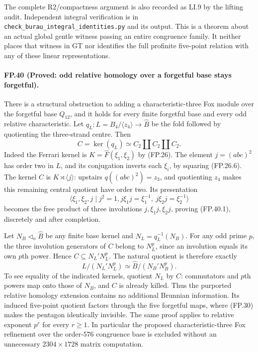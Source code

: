 The complete R2/compactness argument is also recorded as LI.9
by the lifting audit. Independent integral verification is in
\texttt{check\_burau\_integral\_identities.py} and its output.
This is a theorem about an actual global gentle witness passing
an entire congruence family. It neither places that witness in
GT nor identifies the full profinite five-point relation with
any of these linear representations.

\paragraph{FP.40 (Proved: odd relative homology over a forgetful base stays forgetful).}
There is a structural obstruction to adding a characteristic-three
Fox module over the forgetful base $Q_{12}$, and it holds for
every finite forgetful base and every odd relative characteristic.
Let $q_L:L=B_4/\langle z_4\rangle\to\widehat B$ be the
fold followed by quotienting the three-strand centre. Then
\[
                  C=\ker(q_L)\simeq C_2\amalg C_2\amalg C_2.
 \tag{FP.40.1}
\]
Indeed the Ferrari kernel is $K=\widehat F(\xi_1,\xi_2)$
by (FP.26). The element $j=(abc)^2$ has order two in $L$,
and its conjugation inverts each $\xi_i$, by squaring
(FP.26.6). The kernel $C$ is $K\rtimes\langle j\rangle$:
upstairs $q((abc)^2)=z_3$, and quotienting $z_4$ makes
this remaining central quotient have order two. Its presentation
\[
 \langle\xi_1,\xi_2,j\mid j^2=1,
           j\xi_1j=\xi_1^{-1},\ j\xi_2j=\xi_2^{-1}\rangle
\]
becomes the free product of three involutions
$j,\xi_1j,\xi_2j$, proving (FP.40.1), discretely and after
completion.

Let $N_B\triangleleft_o\widehat B$ be any finite base kernel
and $N_L=q_L^{-1}(N_B)$. For any odd prime $p$, the three
involution generators of $C$ belong to $N_L^p$, since an
involution equals its own $p$th power. Hence
$C\subseteq N_L'N_L^p$. The natural quotient is therefore
exactly
\[
 \boxed{\quad L/(N_L'N_L^p)
           \simeq\widehat B/(N_B'N_B^p).\quad}
 \tag{FP.40.2}
\]
To see equality of the indicated kernels, quotient $N_L$ by
$C$: commutators and $p$th powers map onto those of $N_B$,
and $C$ is already killed. Thus the purported relative homology
extension contains no additional Brunnian information. Its
induced five-point quotient factors through the five forgetful
maps, where (FP.30) makes the pentagon identically invisible.
The same proof applies to relative exponent $p^r$ for every
$r\geq1$. In particular the proposed characteristic-three
Fox refinement over the order-$576$ congruence base is excluded
without an unnecessary $2304\times1728$ matrix computation.

